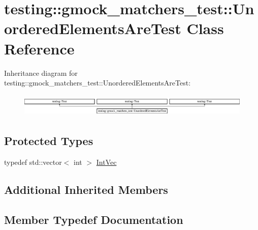 \hypertarget{classtesting_1_1gmock__matchers__test_1_1_unordered_elements_are_test}{}\section{testing\+::gmock\+\_\+matchers\+\_\+test\+::Unordered\+Elements\+Are\+Test Class Reference}
\label{classtesting_1_1gmock__matchers__test_1_1_unordered_elements_are_test}
Inheritance diagram for testing\+::gmock\+\_\+matchers\+\_\+test\+::Unordered\+Elements\+Are\+Test\+:\begin{figure}[H]
\begin{center}
\leavevmode
\includegraphics[height=1.091618cm]{d9/d3e/classtesting_1_1gmock__matchers__test_1_1_unordered_elements_are_test}
\end{center}
\end{figure}
\subsection*{Protected Types}
\begin{DoxyCompactItemize}
\item 
typedef std\+::vector$<$ int $>$ \mbox{\hyperlink{classtesting_1_1gmock__matchers__test_1_1_unordered_elements_are_test_a608750c71652943bd11fe7bb5281588d}{Int\+Vec}}
\end{DoxyCompactItemize}
\subsection*{Additional Inherited Members}


\subsection{Member Typedef Documentation}
\mbox{\label{classtesting_1_1gmock__matchers__test_1_1_unordered_elements_are_test_a608750c71652943bd11fe7bb5281588d}} 
